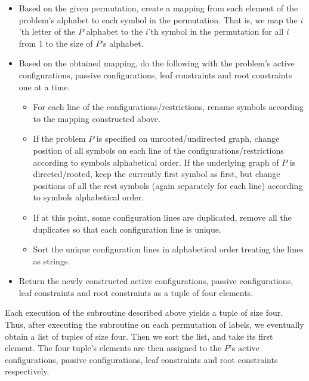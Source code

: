 \begin{itemize}
  \item Based on the given permutation, create a mapping from each
  element of the problem's alphabet to each symbol in the permutation.
  That is, we map the $i$'th letter of the $P$ alphabet to the $i$'th symbol
  in the permutation for all $i$ from 1 to the size of $P$'s alphabet.
  \item Based on the obtained mapping, do the following with the problem's
  active configurations, passive configurations, leaf constraints and
  root constraints one at a time.
  
  \begin{itemize}
    \item For each line of the configurations/restrictions, rename symbols
    according to the mapping constructed above.
    \item If the problem $P$ is specified on unrooted/undirected graph,
    change position of all symbols on each line of the configurations/restrictions according to symbols alphabetical order.
    If the underlying graph of $P$ is directed/rooted, keep the currently first
    symbol as first, but change positions of all the rest symbols (again separately for each line)
    according to symbols alphabetical order.
    \item If at this point, some configuration lines are
    duplicated, remove all the duplicates so that each configuration
    line is unique.
    \item Sort the unique configuration lines in alphabetical order
    treating the lines as strings.
  \end{itemize}

  \item Return the newly constructed active configurations,
  passive configurations, leaf constraints and root constraints as
  a tuple of four elements.
\end{itemize}

Each execution of the subroutine described above yields a tuple
of size four. Thus, after executing the subroutine on each permutation of
labels, we eventually obtain a list of tuples of size four.
Then we sort the list, and take its first element. The four
tuple's elements are then assigned to the $P$'s
active configurations, passive configurations, leaf
constraints and root constraints respectively.


